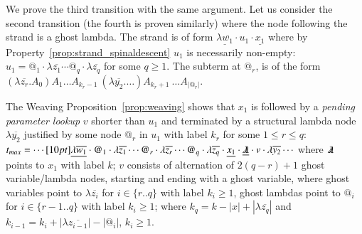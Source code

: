 \documentclass{elsarticle}
\theoremstyle{plain}
\theoremstyle{definition}
\newcommand{\ghostlmd}{{\lambda\mkern-7mu \lambda}}
\begin{document}
We prove the third transition with the same argument.
Let us consider the second transition (the fourth is proven similarly) where the node following the strand is a ghost lambda. The strand is of form $\underline{\lambda\overline{w_1}} \cdot u_1 \cdot \underline{x_1} $ where by Property~\ref{prop:strand_spinaldescent} $u_1$ is necessarily non-empty: $u_1 =
@_1 \cdot\lambda\overline{z_1} \cdots @_q\cdot \lambda\overline{z_q}$ for some $q\geq 1$. The subterm at $@_r$, is of the form
$(\lambda\overline{z_r}. A_0) A_1 \ldots A_{k_{r}-1}\ (\lambda\overline{y_2}. \ldots)A_{k_{r}+1}\ \ldots A_{|@_r|}$.

The Weaving Proposition~\ref{prop:weaving} shows that $x_1$ is followed by a \emph{pending parameter lookup} $v$ shorter than $u_1$ and terminated by a structural lambda node $\lambda\overline{y_2}$ justified by some node $@_r$ in $u_1$ with label $k_r$ for some $1\leq r \leq q$:
$
   t_{max} = \cdots \Pstr[10pt]{
   {\underline{\lambda\overline{w_1}}}
   \cdot {@_1}
   \cdot \lambda\overline{z_1}
   \cdots %
        {@_r}
   \cdot \lambda\overline{z_r}
   \cdots {@_q}
   \cdot\lambda\overline{z_q}
   \cdot %
        {\underline{x_1}}
   \cdot %
        {\underline\ghostlmd}
   \cdot v
   \cdot %
        {\lambda\overline{y_2}}
   \cdots }
   $
where
$\ghostlmd$ points to $x_1$ with label $k$;
$v$ consists of alternation of $2(q-r) +1$ ghost variable/lambda nodes, starting and ending with a ghost variable,
where ghost variables point to $\lambda\overline{z_i}$ for
$i \in \{ r..q \}$ with label $k_i\geq1$,
ghost lambdas point to $@_i$ for $i \in \{ r-1..q \}$ with label $k_i\geq1$;
where $k_q = k - |x| + |\lambda\overline{z_q}|$ and $ k_{i-1} = k_i + |\lambda\overline{z_{i-1}}| - |@_i|$, $k_i\geq1$.
\end{document}
